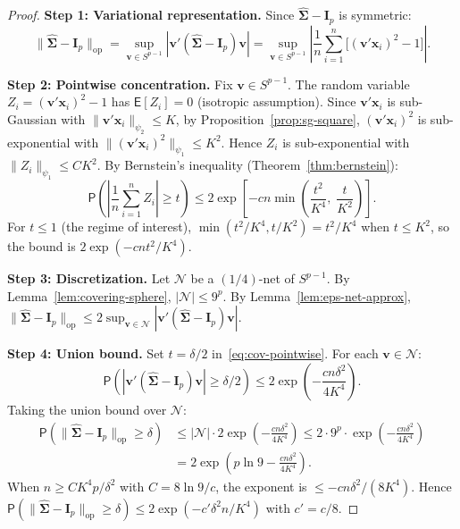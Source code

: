 \documentclass[14pt]{extarticle}
\theoremstyle{plain}
\theoremstyle{definition}
\theoremstyle{remark}
\newcommand\expc{\mathsf{E}}
\newcommand\prb{\mathsf{P}}
\newcommand{\bx}{\mathbf{x}}
\newcommand{\bI}{\mathbf{I}}
\newcommand{\bv}{\mathbf{v}}
\newcommand{\calN}{\mathcal{N}}
\newcommand{\hbSigma}{\hat{\boldsymbol{\Sigma}}}
\newcommand{\opnorm}[1]{\|#1\|_{\mathrm{op}}}
\begin{document}
\begin{proof}
\textbf{Step 1: Variational representation.} Since $\hbSigma - \bI_p$ is symmetric:
\[
\opnorm{\hbSigma - \bI_p} = \sup_{\bv \in S^{p-1}} |\bv'(\hbSigma - \bI_p)\bv| = \sup_{\bv \in S^{p-1}}\left|\frac{1}{n}\sum_{i=1}^n \bigl[(\bv'\bx_i)^2 - 1\bigr]\right|.
\]

\textbf{Step 2: Pointwise concentration.} Fix $\bv \in S^{p-1}$. The random variable $Z_i = (\bv'\bx_i)^2 - 1$ has $\expc[Z_i] = 0$ (isotropic assumption). Since $\bv'\bx_i$ is sub-Gaussian with $\|\bv'\bx_i\|_{\psi_2} \leqslant K$, by Proposition~\ref{prop:sg-square}, $(\bv'\bx_i)^2$ is sub-exponential with $\|(\bv'\bx_i)^2\|_{\psi_1} \leqslant K^2$. Hence $Z_i$ is sub-exponential with $\|Z_i\|_{\psi_1} \leqslant CK^2$. By Bernstein's inequality (Theorem~\ref{thm:bernstein}):
\begin{equation}\label{eq:cov-pointwise}
\prb\!\left(\left|\frac{1}{n}\sum_{i=1}^n Z_i\right| \geqslant t\right) \leqslant 2\exp\!\left[-cn\min\!\left(\frac{t^2}{K^4},\; \frac{t}{K^2}\right)\right].
\end{equation}
For $t \leqslant 1$ (the regime of interest), $\min(t^2/K^4, t/K^2) = t^2/K^4$ when $t \leqslant K^2$, so the bound is $2\exp(-cnt^2/K^4)$.

\textbf{Step 3: Discretization.} Let $\calN$ be a $(1/4)$-net of $S^{p-1}$. By Lemma~\ref{lem:covering-sphere}, $|\calN| \leqslant 9^p$. By Lemma~\ref{lem:eps-net-approx}, $\opnorm{\hbSigma - \bI_p} \leqslant 2\sup_{\bv \in \calN} |\bv'(\hbSigma - \bI_p)\bv|$.

\textbf{Step 4: Union bound.} Set $t = \delta/2$ in~\eqref{eq:cov-pointwise}. For each $\bv \in \calN$:
\[
\prb\!\left(|\bv'(\hbSigma - \bI_p)\bv| \geqslant \delta/2\right) \leqslant 2\exp\!\left(-\frac{cn\delta^2}{4K^4}\right).
\]
Taking the union bound over $\calN$:
\begin{align*}
\prb\!\left(\opnorm{\hbSigma - \bI_p} \geqslant \delta\right) &\leqslant |\calN|\cdot 2\exp\!\left(-\frac{cn\delta^2}{4K^4}\right) \leqslant 2\cdot 9^p\cdot\exp\!\left(-\frac{cn\delta^2}{4K^4}\right)\\
&= 2\exp\!\left(p\ln 9 - \frac{cn\delta^2}{4K^4}\right).
\end{align*}
When $n \geqslant CK^4 p/\delta^2$ with $C = 8\ln 9/c$, the exponent is $\leqslant -cn\delta^2/(8K^4)$. Hence $\prb(\opnorm{\hbSigma - \bI_p} \geqslant \delta) \leqslant 2\exp(-c'\delta^2 n/K^4)$ with $c' = c/8$.
\end{proof}

\end{document}
